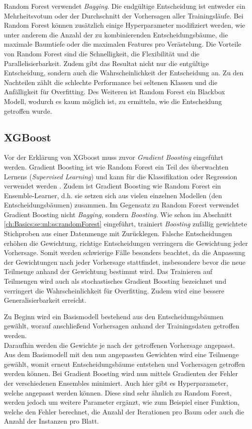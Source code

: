 Random Forest verwendet \textit{Bagging}. 
Die endgültige Entscheidung ist entweder ein Mehrheitsvotum oder der Durchschnitt der Vorhersagen aller Trainingsläufe.
Bei Random Forest können zusätzlich einige Hyperparameter modifiziert werden, wie unter anderem die Anzahl der zu kombinierenden Entscheidungsbäume, die maximale Baumtiefe oder die maximalen Features pro Verästelung. 
Die Vorteile von Random Forest sind die Schnelligkeit, die Flexibilität und die Parallelisierbarkeit.
Zudem gibt das Resultat nicht nur die entgültige Entscheidung, sondern auch die Wahrscheinlichkeit der Entscheidung an.
Zu den Nachteilen zählt die schlechte Performance bei seltenen Klassen und die Anfälligkeit für Overfitting.
Des Weiteren ist Random Forest ein Blackbox Modell, wodurch es kaum möglich ist, zu ermitteln, wie die Entscheidung getroffen wurde.

\subsection{XGBoost}
\label{ch:Basics:se:ml:ss:xgboost}
Vor der Erklärung von XGboost muss zuvor \textit{Gradient Boosting} eingeführt werden.
Gradient Boosting ist wie Random Forest ein Teil des überwachten Lernens (\textit{Supervised Learning}) und kann für die Klassifikation oder Regression verwendet werden \cite{friedmannStochasticGradientBoosting1999}. 
Zudem ist Gradient Boosting wie Random Forest ein Ensemble-Learner, d.h. sie setzen sich aus vielen einzelnen Modellen (den Entscheidungsbäumen) zusammen.
Im Gegensatz zu Random Forest verwendet Gradient Boosting nicht \textit{Bagging}, sondern \textit{Boosting}.
Wie schon im Abschnitt \ref{ch:Basics:se:ml:ss:randomForest} eingeführt, trainiert \textit{Boosting} zufällig gewichtete Stichproben aus einer Datenmenge mit Zurücklegen. 
Falsche Entscheidungen erhöhen die Gewichtung, richtige Entscheidungen verringern die Gewichtung jeder Vorhersage. 
Somit werden schwierige Fälle besonders beachtet, da die Anpassung der Gewichtungen nach jeder Vorhersage stattfindet, insbesondere bevor die neue Teilmenge anhand der Gewichtung bestimmt wird.
Das Trainieren auf Teilmengen wird auch als stochastisches Gradient Boosting bezeichnet und verringert die Wahrscheinlichkeit für Overfitting.
Zudem wird eine bessere Generalisierbarkeit erreicht.

Zu Beginn wird ein Basismodell bestehend aus den Entscheidungsbäumen gewählt, worauf anschließend Vorhersagen anhand der Trainingsdaten getroffen werden. \\
Daraufhin werden die Gewichte je nach der getroffenen Vorhersage angepasst.
Aus dem Basismodell mit den nun angepassten Gewichten wird eine Teilmenge gewählt, womit erneut Entscheidungsbäume entstehen und Vorhersagen getroffen werden können.
Bei Gradient Boosting wird nun mittels Gradienten der Fehler der verschiedenen Ensembles minimiert.
Auch hier gibt es Hyperparameter, welche angepasst werden können. 
Diese sind sehr ähnlich zu Random Forest, werden jedoch um weitere Parameter ergänzt, wie zum Beispiel einer Funktion, welche den Fehler berechnet, die Anzahl der Iterationen pro Baum oder auch die Anzahl der Instanzen pro Blatt.

